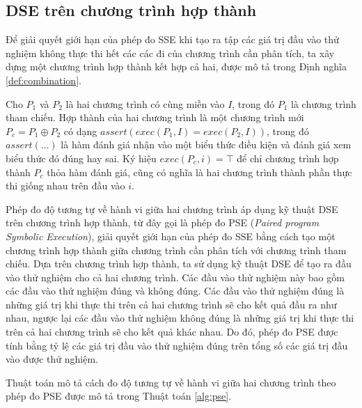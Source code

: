 \subsection{DSE trên chương trình hợp thành}

Để giải quyết giới hạn của phép đo SSE khi tạo ra tập các giá trị đầu
vào thử nghiệm không thực thi hết các các đi của chương trình cần phân
tích, ta xây dựng một chương trình hợp thành kết hợp cả hai, được mô
tả trong Định nghĩa \ref{def:combination}.

\begin{definition}
  \label{def:combination}
  Cho $P_1$ và $P_2$ là hai chương trình có cùng miền vào $I$, trong đó
  $P_1$ là chương trình tham chiếu. Hợp thành của hai chương trình là
  một chương trình mới $P_c = P_1 \oplus P_2$ có dạng
  $assert(exec(P_{1}, I) = exec(P_{2}, I))$, trong đó $assert(\dots)$
  là hàm đánh giá nhận vào một biểu thức điều kiện và đánh giá xem
  biểu thức đó đúng hay sai. Ký hiệu $exec(P_c,i) = \top$ để chỉ
  chương trình hợp thành $P_c$ thỏa hàm đánh giá, cũng có nghĩa là hai
  chương trình thành phần thực thi giống nhau trên đầu vào $i$.
\end{definition}

Phép đo độ tương tự về hành vi giữa hai chương trình áp dụng kỹ thuật
DSE trên chương trình hợp thành, từ đây gọi là phép đo PSE
(\emph{Paired program Symbolic Execution}), giải quyết giới hạn của
phép đo SSE bằng cách tạo một chương trình hợp thành giữa chương trình
cần phân tích với chương trình tham chiếu. Dựa trên chương trình hợp
thành, ta sử dụng kỹ thuật DSE để tạo ra đầu vào thử nghiệm cho cả hai
chương trình. Các đầu vào thử nghiệm này bao gồm các đầu vào thử
nghiệm đúng và không đúng. Các đầu vào thử nghiệm đúng là những giá
trị khi thực thi trên cả hai chương trình sẽ cho kết quả đầu ra như
nhau, ngược lại các đầu vào thử nghiệm không đúng là những giá trị khi
thực thi trên cả hai chương trình sẽ cho kết quả khác nhau. Do đó,
phép đo PSE được tính bằng tỷ lệ các giá trị đầu vào thử
nghiệm đúng trên tổng số các giá trị đầu vào được thử nghiệm.

Thuật toán mô tả cách đo độ tương tự về hành vi giữa hai chương trình theo phép đo PSE được mô tả trong Thuật toán \ref{alg:pse}.

